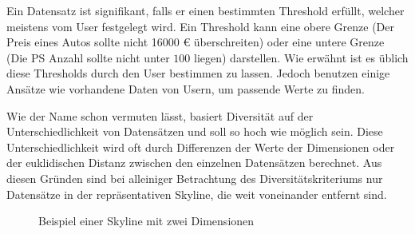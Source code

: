 {Ein Datensatz ist signifikant, falls er einen bestimmten Threshold erfüllt, welcher meistens vom User festgelegt wird. Ein Threshold kann eine obere Grenze (Der Preis eines Autos sollte nicht 16000 \euro{} überschreiten) oder eine untere Grenze (Die PS Anzahl sollte nicht unter $100$ liegen) darstellen. 
Wie erwähnt ist es üblich diese Thresholds durch den User bestimmen zu lassen. Jedoch benutzen einige Ansätze wie \cite{36988} vorhandene Daten von Usern, um passende Werte zu finden.

Wie der Name schon vermuten lässt, basiert Diversität auf der Unterschiedlichkeit von Datensätzen und soll so hoch wie möglich sein. Diese Unterschiedlichkeit wird oft durch Differenzen der Werte der Dimensionen oder der euklidischen Distanz zwischen den einzelnen Datensätzen berechnet. 
Aus diesen Gründen sind bei alleiniger Betrachtung des Diversitätskriteriums nur Datensätze in der repräsentativen Skyline, die weit voneinander entfernt sind. 

\begin{figure}[H]
	\centering
	\caption{Beispiel einer Skyline mit zwei Dimensionen}
	\label{img:diversitaetExample}
\end{figure}

}
